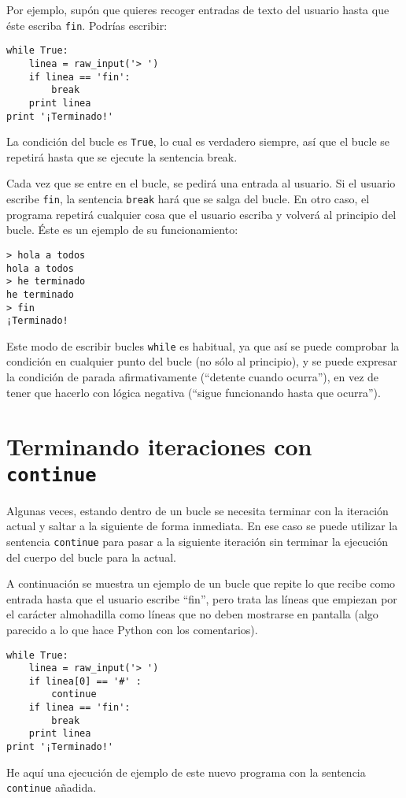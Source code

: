 Por ejemplo, supón que quieres recoger entradas de texto del usuario hasta que
éste escriba {\tt fin}. Podrías escribir:

\beforeverb
\begin{verbatim}
while True:
    linea = raw_input('> ')
    if linea == 'fin':
        break
    print linea
print '¡Terminado!'
\end{verbatim}
\afterverb
%
La condición del bucle es {\tt True}, lo cual es verdadero siempre, así que
el bucle se repetirá hasta que se ejecute la sentencia break.

Cada vez que se entre en el bucle, se pedirá una entrada al usuario.
Si el usuario escribe {\tt fin}, la sentencia {\tt break} hará que se
salga del bucle. En otro caso, el programa repetirá cualquier cosa que el usuario
escriba y volverá al principio del bucle. Éste es un ejemplo de su funcionamiento:

\beforeverb
\begin{verbatim}
> hola a todos
hola a todos
> he terminado
he terminado
> fin
¡Terminado!
\end{verbatim}
\afterverb
%
Este modo de escribir bucles {\tt while} es habitual, ya que
así se puede comprobar la condición en cualquier punto del
bucle (no sólo al principio), y se puede expresar la condición de parada
afirmativamente (``detente cuando ocurra''), en vez de tener que hacerlo con lógica negativa
(``sigue funcionando hasta que ocurra'').

\section{Terminando iteraciones con {\tt continue}}

Algunas veces, estando dentro de un bucle se necesita
terminar con la iteración actual y saltar a la siguiente de forma inmediata.
En ese caso se puede utilizar la sentencia
{\tt continue} para pasar a la siguiente iteración sin terminar
la ejecución del cuerpo del bucle para la actual.

A continuación se muestra un ejemplo de un bucle que repite lo que recibe como entrada hasta que
el usuario escribe ``fin'', pero trata las líneas que empiezan por el carácter almohadilla
como líneas que no deben mostrarse en pantalla (algo parecido a lo que hace Python con los comentarios).

\beforeverb
\begin{verbatim}
while True:
    linea = raw_input('> ')
    if linea[0] == '#' :
        continue
    if linea == 'fin':
        break
    print linea
print '¡Terminado!'
\end{verbatim}
\afterverb
%
He aquí una ejecución de ejemplo de este nuevo programa con la sentencia {\tt continue} añadida.

